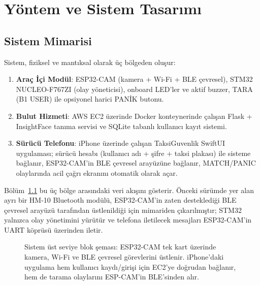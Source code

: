 \chapter{Yöntem ve Sistem Tasarımı}
\label{ch:yontem}

\section{Sistem Mimarisi}
\label{sec:mimari}

Sistem, fiziksel ve mantıksal olarak üç bölgeden oluşur:

\begin{enumerate}
    \item \textbf{Araç İçi Modül}: ESP32-CAM (kamera + Wi-Fi + BLE çevresel),
          STM32 NUCLEO-F767ZI (olay yöneticisi), onboard LED'ler ve aktif
          buzzer, TARA (B1 USER) ile opsiyonel harici PANİK butonu.
    \item \textbf{Bulut Hizmeti}: AWS EC2 üzerinde Docker konteynerinde
          çalışan Flask + InsightFace tanıma servisi ve SQLite tabanlı
          kullanıcı kayıt sistemi.
    \item \textbf{Sürücü Telefonu}: iPhone üzerinde çalışan TaksiGuvenlik
          SwiftUI uygulaması; sürücü hesabı (kullanıcı adı + şifre + taksi
          plakası) ile sisteme bağlanır, ESP32-CAM'in BLE çevresel arayüzüne
          bağlanır, MATCH/PANIC olaylarında acil çağrı ekranını otomatik
          olarak açar.
\end{enumerate}

Bölüm~\ref{fig:sistem-mimarisi} bu üç bölge arasındaki veri akışını gösterir.
Önceki sürümde yer alan ayrı bir HM-10 Bluetooth modülü, ESP32-CAM'in
zaten desteklediği BLE çevresel arayüzü tarafından üstlenildiği için
mimariden çıkarılmıştır; STM32 yalnızca olay yönetimini yürütür ve
telefona iletilecek mesajları ESP32-CAM'in UART köprüsü üzerinden iletir.

\begin{figure}[h!]
\centering
{}
\caption{Sistem üst seviye blok şeması: ESP32-CAM tek kart üzerinde kamera, Wi-Fi ve BLE çevresel görevlerini üstlenir. iPhone'daki uygulama hem kullanıcı kaydı/girişi için EC2'ye doğrudan bağlanır, hem de tarama olaylarını ESP-CAM'in BLE'sinden alır.}
\label{fig:sistem-mimarisi}
\end{figure}

